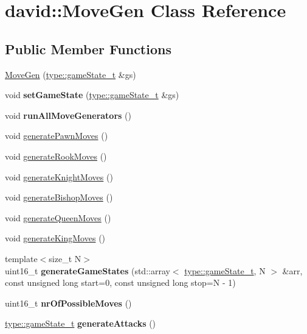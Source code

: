 \hypertarget{classdavid_1_1MoveGen}{}\section{david\+:\+:Move\+Gen Class Reference}
\label{classdavid_1_1MoveGen}
\subsection*{Public Member Functions}
\begin{DoxyCompactItemize}
\item 
\hyperlink{classdavid_1_1MoveGen_a36e125d25c15f5ce205d7f2843f8f3c9}{Move\+Gen} (\hyperlink{structdavid_1_1bitboard_1_1gameState}{type\+::game\+State\+\_\+t} \&gs)
\item 
\mbox{\label{classdavid_1_1MoveGen_a38412012c820f74eecacd76ae208ca93}} 
void {\bfseries set\+Game\+State} (\hyperlink{structdavid_1_1bitboard_1_1gameState}{type\+::game\+State\+\_\+t} \&gs)
\item 
\mbox{\label{classdavid_1_1MoveGen_ac5f61844feca4af99268276703693a68}} 
void {\bfseries run\+All\+Move\+Generators} ()
\item 
void \hyperlink{classdavid_1_1MoveGen_a4e521a22effe648f7efe62d147cdd29f}{generate\+Pawn\+Moves} ()
\item 
void \hyperlink{classdavid_1_1MoveGen_a5658568059a418aa87c6abaec120fa07}{generate\+Rook\+Moves} ()
\item 
void \hyperlink{classdavid_1_1MoveGen_a19c96f5c67ae7c5ca466f6a4dada6343}{generate\+Knight\+Moves} ()
\item 
void \hyperlink{classdavid_1_1MoveGen_a58f32c0d7f2d7df1ed6a6a53a85cb9e7}{generate\+Bishop\+Moves} ()
\item 
void \hyperlink{classdavid_1_1MoveGen_a333ddcfe5d1f26d9edf631229bf6edbf}{generate\+Queen\+Moves} ()
\item 
void \hyperlink{classdavid_1_1MoveGen_af6addc5f8801d660b54885a61c9723ad}{generate\+King\+Moves} ()
\item 
\mbox{\label{classdavid_1_1MoveGen_a9ff1f7c7581bba85c26c97f6473df3f5}} 
{\footnotesize template$<$size\+\_\+t N$>$ }\\uint16\+\_\+t {\bfseries generate\+Game\+States} (std\+::array$<$ \hyperlink{structdavid_1_1bitboard_1_1gameState}{type\+::game\+State\+\_\+t}, N $>$ \&arr, const unsigned long start=0, const unsigned long stop=N -\/ 1)
\item 
\mbox{\label{classdavid_1_1MoveGen_a6f542d8d2b6f0d50afca11565cd5ff50}} 
uint16\+\_\+t {\bfseries nr\+Of\+Possible\+Moves} ()
\item 
\mbox{\label{classdavid_1_1MoveGen_ac60ac7d171642ae052be46baff52f8e9}} 
\hyperlink{structdavid_1_1bitboard_1_1gameState}{type\+::game\+State\+\_\+t} {\bfseries generate\+Attacks} ()
\end{DoxyCompactItemize}


